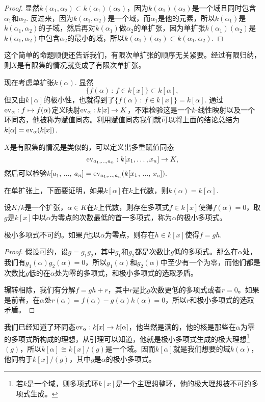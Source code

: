 \begin{proof} 显然$k(\alpha_1,\alpha_2)\subset k(\alpha_1)(\alpha_2)$，因为$k(\alpha_1)(\alpha_2)$是一个域且同时包含$\alpha_1$和$\alpha_2$. 反过来，因为$k(\alpha_1,\alpha_2)$是一个域，而$\alpha_1$是他的元素，所以$k(\alpha_1)$是$k(\alpha_1,\alpha_2)$的子域，然后再对$k(\alpha_1)$做$\alpha_2$的单扩张，因为单扩张$k(\alpha_1)(\alpha_2)$是$k(\alpha_1,\alpha_2)$中包含$\alpha_2$的最小的域，所以$k(\alpha_1)(\alpha_2)\subset k(\alpha_1,\alpha_2)$.\end{proof}

这个简单的命题顺便还告诉我们，有限次单扩张的顺序无关紧要。经过有限归纳，则$X$是有限集的情况就变成了有限次单扩张。

\para 现在考虑单扩张$k(\alpha)$. 显然
\[
	\{f(\alpha)\,:\, f\in k[x]\}\subset k[\alpha],
\]
但又由$k[\alpha]$的极小性，也就得到了$\{f(\alpha)\,:\, f\in k[x]\}=k[\alpha]$. 通过$\operatorname{ev}_{\alpha}:f\mapsto f(\alpha)$定义映射$\operatorname{ev}_{\alpha}:k[x]\to K$，不难检验这是一个$k$-线性映射以及一个环同态，他被称为赋值同态。利用赋值同态我们就可以将上面的结论总结为$k[\alpha]=\operatorname{ev}_{\alpha}(k[x])$.

$X$是有限集的情况是类似的，可以定义出多重赋值同态
\[
	\operatorname{ev}_{a_1,\dots,a_n}:k[x_1,\dots,x_n]\to K,
\]
然后可以检验$k[a_1$, $\dots$, $a_n]=\operatorname{ev}_{a_1,\dots,a_n}(k[x_1$, $\dots$, $x_n])$.

在单扩张上，下面要证明，如果$k[\alpha]$在$k$上代数，则$k(\alpha)=k[\alpha]$.

\para 设$K/k$是一个扩张，$\alpha\in K$在$k$上代数，则存在多项式$f\in k[x]$使得$f(\alpha)=0$，取$g$是$k[x]$中以$\alpha$为零点的次数最低的首一多项式，称为$\alpha$的极小多项式。

\begin{lem}
极小多项式不可约。如果$f$也以$\alpha$为零点，则存在$h\in k[x]$使得$f=gh$.
\end{lem}

\begin{proof} 
	假设可约，设$g=g_1g_2$，其中$g_1$和$g_2$都是次数比$g$低的多项式。那么在$\alpha$处，我们有$g_1(\alpha)g_2(\alpha)=0$，所以$g_1(\alpha)$和$g_2(\alpha)$中至少有一个为零，而他们都是次数比$g$低的在$\alpha$处为零的多项式，和极小多项式的选取矛盾。

	辗转相除，我们有分解$f=gh+r$，其中$r$是比$g$次数更低的多项式或者$r=0$。如果是前者，在$\alpha$处$r(\alpha)=f(\alpha)-g(\alpha)h(\alpha)=0$，所以$r$和极小多项式的选取矛盾。
\end{proof}

我们已经知道了环同态$\operatorname{ev}_\alpha:k[x]\to k[\alpha]$，他当然是满的，他的核是那些在$\alpha$为零的多项式所构成的理想，从引理可以知道，他就是极小多项式生成的极大理想\footnote{若$k$是一个域，则多项式环$k[x]$是一个主理想整环，他的极大理想被不可约多项式生成。}$(g)$，所以$k[\alpha]\cong k[x]/(g)$是一个域。因而$k[\alpha]$就是我们想要的域$k(\alpha)$，他同构于$k[x]/(g)$，其中$g$是$\alpha$的极小多项式。

